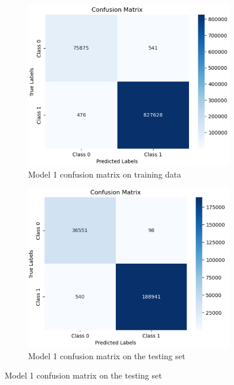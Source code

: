 \begin{figure}[H]%
    \centering
    \begin{subfigure}{0.49\textwidth}
        \centering
        \includegraphics[width=\linewidth]{figures/ev/1_cm1.png}
        \caption{Model 1 confusion matrix on training data}
    \label{fig:1_cm1}
    \end{subfigure}
    \begin{subfigure}{0.49\textwidth}
        \centering
         \includegraphics[width=\linewidth]{figures/ev/1_cm2.png}
        \caption{Model 1 confusion matrix on the testing set}
    \label{fig:1_cm2}
    \end{subfigure}

\end{figure}
